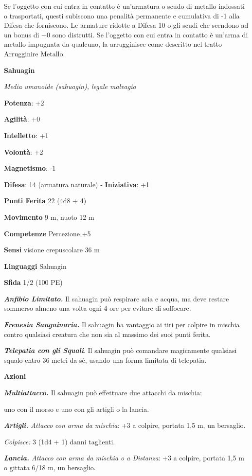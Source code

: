 \begin{multicols}{2}
Se l'oggetto con cui entra in contatto è un'armatura o scudo di metallo
indossati o trasportati, questi subiscono una penalità permanente e
cumulativa di -1 alla Difesa che forniscono. Le armature ridotte a Difesa 10 o
gli scudi che scendono ad un bonus di +0 sono distrutti. Se l'oggetto
con cui entra in contatto è un'arma di metallo impugnata da qualcuno, la
arrugginisce come descritto nel tratto Arrugginire Metallo.

\textbf{Sahuagin}

\emph{Media umanoide (sahuagin), legale malvagio}

\textbf{Potenza}: +2

\textbf{Agilità}: +0

\textbf{Intelletto}: +1

\textbf{Volontà}: +2

\textbf{Magnetismo}: -1

\textbf{Difesa}: 14 (armatura naturale) - \textbf{Iniziativa}: +1

\textbf{Punti Ferita} 22 (4d8 + 4)

\textbf{Movimento} 9 m, nuoto 12 m

\textbf{Competenze} Percezione +5

\textbf{Sensi} visione crepuscolare 36 m

\textbf{Linguaggi} Sahuagin

\textbf{Sfida} 1/2 (100 PE)

\emph{\textbf{Anfibio Limitato.}} Il sahuagin può respirare aria e
acqua, ma deve restare sommerso almeno una volta ogni 4 ore per evitare
di soffocare.

\emph{\textbf{Frenesia Sanguinaria.}} Il sahuagin ha vantaggio ai tiri
per colpire in mischia contro qualsiasi creatura che non sia al massimo
dei suoi punti ferita.

\emph{\textbf{Telepatia con gli Squali}}. Il sahuagin può comandare
magicamente qualsiasi squalo entro 36 metri da sé, usando una forma
limitata di telepatia.

\textbf{Azioni}

\emph{\textbf{Multiattacco.}} Il sahuagin può effettuare due attacchi da
mischia:

uno con il morso e uno con gli artigli o la lancia.

\emph{\textbf{Artigli.} Attacco con arma da mischia}: +3 a colpire,
portata 1,5 m, un bersaglio.

\emph{Colpisce:} 3 (1d4 + 1) danni taglienti.

\emph{\textbf{Lancia.} Attacco con arma da mischia o a Distanza}: +3 a
colpire, portata 1,5 m o gittata 6/18 m, un bersaglio.


\end{multicols}
